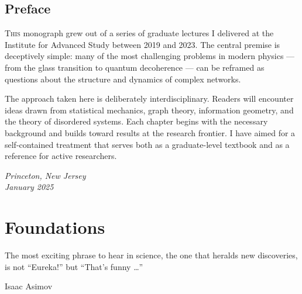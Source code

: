\chapter*{Preface}

\lettrine{T}{his} monograph grew out of a series of graduate lectures I delivered at the Institute for Advanced Study between 2019 and 2023. The central premise is deceptively simple: many of the most challenging problems in modern physics --- from the glass transition to quantum decoherence --- can be reframed as questions about the structure and dynamics of complex networks.

The approach taken here is deliberately interdisciplinary. Readers will encounter ideas drawn from statistical mechanics, graph theory, information geometry, and the theory of disordered systems. Each chapter begins with the necessary background and builds toward results at the research frontier. I have aimed for a self-contained treatment that serves both as a graduate-level textbook and as a reference for active researchers.

\vspace{8pt}
{\small\itshape\color{textdark!60!black}
Princeton, New Jersey\\
January 2025}

\decorule

\part{Foundations}
\epigraph{The most exciting phrase to hear in science, the one that heralds new discoveries, is not ``Eureka!'' but ``That's funny \dots''}{Isaac Asimov}


